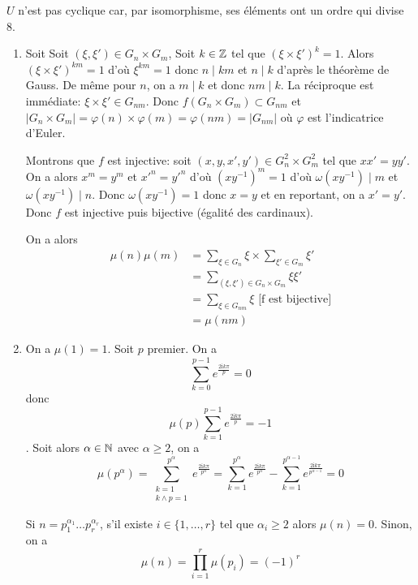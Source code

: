 \begin{remark}
	$U$ n'est pas cyclique car, par isomorphisme, ses éléments ont un ordre qui divise 8.
\end{remark}

\begin{solution}
	\phantom{}
	\begin{enumerate}
		\item Soit 
		Soit $(\xi,\xi')\in G_{n}\times G_{m}$, Soit $k\in\mathbb{Z}$ tel que $(\xi\times\xi')^{k}=1$. Alors $(\xi\times\xi')^{km}=1$ d'où $\xi^{km}=1$ donc $n\mid km$ et $n\mid k$ d'après le théorème de Gauss. De même pour $n$, on a $m\mid k$ et donc $nm\mid k$. La réciproque est immédiate: $\xi\times\xi'\in G_{nm}$. Donc $f(G_{n}\times G_{m})\subset G_{nm}$ et $\vert G_{n}\times G_{m}\vert=\varphi(n)\times\varphi(m)=\varphi(nm)=\vert G_{nm}\vert$ où $\varphi$ est l'indicatrice d'Euler.

		Montrons que $f$ est injective: soit $(x,y,x',y')\in G_{n}^{2}\times G_{m}^{2}$ tel que $xx'=yy'$. On a alors $x^{m}=y^{m}$ et $x'^{n}=y'^{n}$ d'où $(xy^{-1})^{m}=1$ d'où $\omega(xy^{-1})\mid m$ et $\omega(xy^{-1})\mid n$. Donc $\omega(xy^{-1})=1$ donc $x=y$ et en reportant, on a $x'=y'$. Donc $f$ est injective puis bijective (égalité des cardinaux).

		On a alors 
		\begin{align*}
			\mu(n)\mu(m)
			&=\sum_{\xi\in G_{n}}\xi\times\sum_{\xi'\in G_{m}}\xi'\\
			&=\sum_{(\xi,\xi')\in G_{n}\times G_{m}}\xi\xi'\\
			&=\sum_{\xi\in G_{nm}}\xi\text{ [f est bijective]}\\
			&=\mu(nm)
		\end{align*}

		\item On a $\mu(1)=1$. Soit $p$ premier. On a 
		$$\sum_{k=0}^{p-1}e^{\frac{2\mathrm{i}k\pi}{p}}=0$$ 
		donc 
		$$\mu(p)\sum_{k=1}^{p-1}e^{\frac{2\mathrm{i}k\pi}{p}}=-1$$. Soit alors $\alpha\in\mathbb{N}$ avec $\alpha\geqslant2$, on a 
		$$\mu(p^{\alpha})=\sum_{\substack{k=1\\ k\wedge p=1}}^{p^{\alpha}}e^{\frac{2\mathrm{i}k\pi}{p^{\alpha}}}=\sum_{k=1}^{p^{\alpha}}e^{\frac{2\mathrm{i}k\pi}{p^{\alpha}}}-\sum_{k=1}^{p^{\alpha-1}}e^{\frac{2\mathrm{i}k\pi}{p^{\alpha-1}}}=0$$

		Si $n=p_{1}^{\alpha_{1}}\dots p_{r}^{\alpha_{r}}$, s'il existe $i\in\{1,\dots,r\}$ tel que $\alpha_{i}\geqslant2$ alors $\mu(n)=0$. Sinon, on a 
		$$\mu(n)=\prod_{i=1}^{r}\mu(p_{i})=(-1)^{r}$$


\end{enumerate}
\end{solution}

